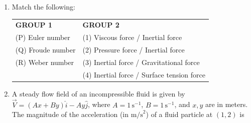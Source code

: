 \documentclass[journal,12pt,onecolumn]{IEEEtran}
\theoremstyle{remark}
\begin{document}
\begin{enumerate}
\item Match the following:
\begin{tabular}{ll}
\textbf{GROUP 1} & \textbf{GROUP 2} \\
(P) Euler number & (1) Viscous force / Inertial force \\
(Q) Froude number & (2) Pressure force / Inertial force \\
(R) Weber number & (3) Inertial force / Gravitational force \\
& (4) Inertial force / Surface tension force \\
\end{tabular}
\hfill{}
\begin{enumerate}[label=(\Alph*)]
\end{enumerate}

\item A steady flow field of an incompressible fluid is given by $\vec{V} = (Ax + By) \hat{i} - Ay \hat{j}$, where $A = 1 \, \text{s}^{-1}$, $B = 1 \, \text{s}^{-1}$, and $x, y$ are in meters. The magnitude of the acceleration (in $\text{m/s}^2$) of a fluid particle at $(1, 2)$ is
\hfill{}
\begin{enumerate}[label=(\Alph*)]
\end{enumerate}


\end{enumerate}
\end{document}
